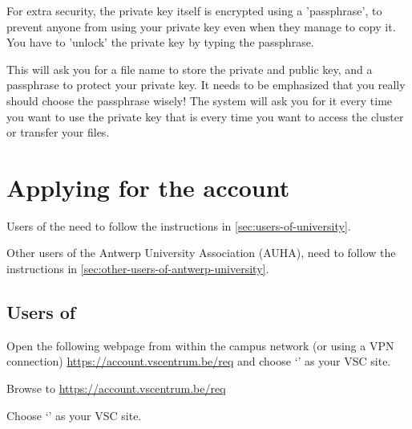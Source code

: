   For extra security, the private key itself is encrypted using a 'passphrase',
  to prevent anyone from using your private key even when they manage to copy
  it. You have to 'unlock' the private key by typing the passphrase.


  This will ask you for a file name to store the private and public key, and a
  passphrase to protect your private key. It needs to be emphasized that you
  really should choose the passphrase wisely! The system will ask you for it
  every time you want to use the private key that is every time you want to
  access the cluster or transfer your files.


\fi

\section{Applying for the account}
\label{sec:applying-for-the-account}

Users of the \university need to follow the instructions in \autoref{sec:users-of-university}.

\ifantwerpen
Other users of the Antwerp University Association (AUHA), need to follow the
instructions in \autoref{sec:other-users-of-antwerp-university}.
\fi

\subsection{Users of \university}
\label{sec:users-of-university}

Open the following webpage from within the \university campus network (or using a VPN
connection) \url{https://account.vscentrum.be/req} and choose `\sitename' as your VSC
site.

Browse to \url{https://account.vscentrum.be/req}

Choose `\sitename' as your VSC site.

